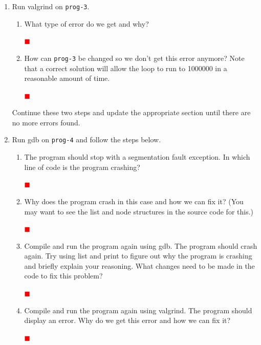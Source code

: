 \documentclass[12pt]{article}
\newcounter{problem}
\newenvironment{solution}{\par\textcolor{green!50!black}\bgroup}{\egroup\par}
\newcommand{\TODO}{\textcolor{red}{$\blacksquare$}}
\begin{document}
\begin{enumerate}
\subsection{Choice of Exercise}

For full credit, you must complete at least \textbf{one} of questions 3-5.
You may also get extra credit for correctly answering each of the remaining two questions of 3-5.

\item Run valgrind on \texttt{prog-3}.
\begin{enumerate}
\item What type of error do we get and why?
  \begin{solution}
  \textbf{\textcolor{red}{\TODO}}
  \end{solution}
\item How can \texttt{prog-3} be changed so we don't get this error anymore?
  Note that a correct solution will allow the loop to run to 1000000 in a
  reasonable amount of time.
  \begin{solution}
  \textbf{\textcolor{red}{\TODO}}
  \end{solution}
\end{enumerate}
Continue these two steps and update the appropriate section until there are no more errors found.

\item Run gdb on \texttt{prog-4} and follow the steps below.
  \begin{enumerate}
  \item The program should stop with a segmentation fault exception. In which line
    of code is the program crashing?
    \begin{solution}
  \textbf{\textcolor{red}{\TODO}}
    \end{solution}
  \item Why does the program crash in this case and how we can fix it? (You may
    want to see the list and node structures in the source code for this.)
    \begin{solution}
  \textbf{\textcolor{red}{\TODO}}
    \end{solution}
  \item Compile and run the program again using gdb. The program should crash
    again. Try using list and print to figure out why the program is crashing and
    briefly explain your reasoning. What changes need to be made in the code to
    fix this problem?
    \begin{solution}
  \textbf{\textcolor{red}{\TODO}}
    \end{solution}
  \item Compile and run the program again using valgrind. The program should
    display an error. Why do we get this error and how we can fix it?
    \begin{solution}
  \textbf{\textcolor{red}{\TODO}}
    \end{solution}
  \end{enumerate}


\end{enumerate}
\end{document}
